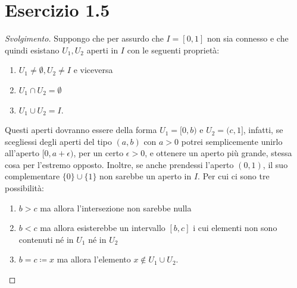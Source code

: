 \documentclass[italian,a4paper,11pt]{article}
\begin{document}
\section*{Esercizio 1.5}
\begin{proof}[Svolgimento]
Suppongo che per assurdo che $I = \left[0,1\right]$ non sia connesso e che quindi esistano $U_1, U_2$ aperti in $I$ con le seguenti proprietà:
\begin{enumerate}
\item $U_1 \neq \emptyset , U_2 \neq I$ e viceversa
\item $U_1 \cap U_2 = \emptyset$
\item $U_1 \cup U_2 = I.$  
\end{enumerate}

Questi aperti dovranno essere della forma $U_1 = [0,b)$ e $U_2 = (c,1]$, infatti, se scegliessi degli aperti del tipo $(a,b)$ con $a>0$ potrei semplicemente unirlo all'aperto $[0,a+\epsilon )$, per un certo $\epsilon>0$, e ottenere un aperto più grande, stessa cosa per l'estremo opposto. Inoltre, se anche prendessi l'aperto $(0,1)$, il suo complementare $\{0\}\cup\{1\}$ non sarebbe un aperto in $I$.
Per cui ci sono tre possibilità:
\begin{enumerate}
\item $b>c$ ma allora l'intersezione non sarebbe nulla
\item $b<c$ ma allora esisterebbe un intervallo $[b,c]$ i cui elementi non sono contenuti né in $U_1$ né in $U_2$
\item $b=c \coloneqq x$ ma allora l'elemento $x \notin U_1 \cup U_2$.  
\end{enumerate}

\end{proof}
\end{document}
